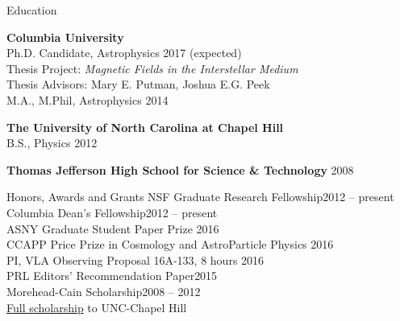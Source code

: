 \documentclass{resume_clark} %
\begin{document}

\begin{rSection}{Education}

{\bf Columbia University}  \\ 
Ph.D. Candidate, Astrophysics  \hfill {2017 (expected)}  \\
\hspace*{0.5cm}Thesis Project: {\em Magnetic Fields in the Interstellar Medium}\\
\hspace*{0.5cm}Thesis Advisors: Mary E. Putman, Joshua E.G. Peek\\
M.A., M.Phil, Astrophysics \hfill {2014}  \\

\vspace{-0.3cm}

{\bf The University of North Carolina at Chapel Hill}\\ 
B.S., Physics \hfill {2012}\\

\vspace{-0.3cm}

{\bf Thomas Jefferson High School for Science \& Technology} \hfill {2008}\\

\end{rSection}


\begin{rSection}{Honors, Awards and Grants}
NSF Graduate Research Fellowship\hfill {2012 -- present}\\
Columbia Dean's Fellowship\hfill {2012 -- present}\\
ASNY Graduate Student Paper Prize \hfill{2016}\\
CCAPP Price Prize in Cosmology and AstroParticle Physics \hfill{2016}\\
PI, VLA Observing Proposal 16A-133, 8 hours \hfill{2016}\\
PRL Editors' Recommendation Paper\hfill {2015}\\
Morehead-Cain Scholarship\hfill {2008 -- 2012}\\
\hspace*{0.5cm}\href{http://www.moreheadcain.org}{Full scholarship} to UNC-Chapel Hill\\

\end{rSection}
\end{document}
